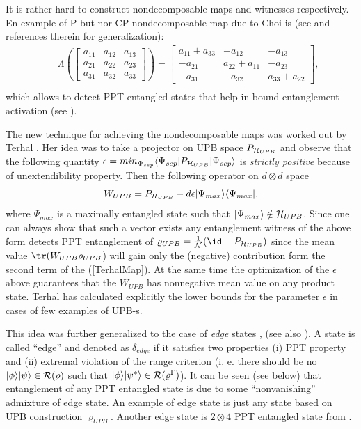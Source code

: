 \documentclass[rmp,12pt,preprint]{revtex4-2}
\begin{document}
It is rather hard to construct nondecomposable maps and witnesses
respectively. En example of P but nor CP nondecomposable map due to
Choi is \cite{Choi82} (see \cite{Kossakowski} and references therein
for generalization):
\begin{eqnarray}
&&\Lambda( \left[ \begin{array}{ccc}
a_{11} & a_{12}& a_{13}  \\
a_{21} &a_{22}&a_{23}    \\
a_{31} &a_{32}& a_{33}
       \end{array}
      \right ])=
\left[ \begin{array}{ccc}
a_{11}+a_{33}  & - a_{12}& -a_{13}  \\
-a_{21} &a_{22}+ a_{11}& -a_{23}    \\
-a_{31} &-a_{32}& a_{33}+a_{22}
       \end{array}
      \right ], \nonumber \\
\end{eqnarray}
which allows to detect PPT entangled states that help in bound
entanglement activation (see \cite{activation}).

The new technique for achieving the nondecomposable maps was worked
out by Terhal \cite{Terhal2000-laa}. Her idea was to take a projector
on UPB space $P_{{\cal H}_{UPB}}$ and observe that the following
quantity $\epsilon = min_{\Psi_{sep}} \langle \Psi_{sep}|P_{{\cal
    H}_{UPB}} | \Psi_{sep} \rangle $ is {\it strictly positive}
because of unextendibility property. Then the following operator on $d
\otimes d$ space
\begin{equation}
W_{UPB}=P_{{\cal H}_{UPB}} - d \epsilon |\Psi_{max}\rangle \langle
\Psi_{max}|, \label{TerhalMap}
\end{equation}
where $\Psi_{max}$ is a maximally entangled state such that
$|\Psi_{max} \rangle \notin {\cal H}_{UPB} $. Since one can always
show that such a vector exists any entanglement witness of the above
form detects PPT entanglement of $\varrho_{UPB}= \frac{1}{\cal N}(\id
-P_{{\cal H}_{UPB}})$ since the mean value
${\tr}(W_{UPB}\varrho_{UPB}$) will gain only the (negative)
contribution form the second term of the (\ref{TerhalMap}). At the
same time the optimization of the $\epsilon$ above guarantees that the
$W_{UPB}$ has nonnegative mean value on any product state.  Terhal has
calculated explicitly the lower bounds for the parameter $\epsilon$ in
cases of few examples of UPB-s.

This idea was further generalized to the case of {\it edge} states
\cite{Lewenstein00a}, (see also
\cite{Karnas,Ho00,LewensteinSanpera-bsa}). A state is called ``edge''
and denoted as $\delta_{edge}$ if it satisfies two properties (i) PPT
property and (ii) extremal violation of the range criterion (i. e.
there should be no $|\phi \rangle| \psi\rangle \in {\cal R}(\varrho)$
such that $|\phi\rangle| \psi^{*}\rangle \in {\cal
  R}(\varrho^{\Gamma})$). It can be seen (see below) that entanglement
of any PPT entangled state is due to some ``nonvanishing'' admixture
of edge state. An example of edge state is just any state based on UPB
construction $\varrho_{UPB}$. Another edge state is $2 \otimes 4$ PPT
entangled state from \cite{Pawel97}.
\end{document}
